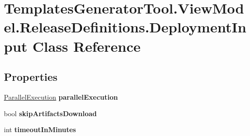 \hypertarget{class_templates_generator_tool_1_1_view_model_1_1_release_definitions_1_1_deployment_input}{}\section{Templates\+Generator\+Tool.\+View\+Model.\+Release\+Definitions.\+Deployment\+Input Class Reference}
\label{class_templates_generator_tool_1_1_view_model_1_1_release_definitions_1_1_deployment_input}
\subsection*{Properties}
\begin{DoxyCompactItemize}
\item 
\mbox{\label{class_templates_generator_tool_1_1_view_model_1_1_release_definitions_1_1_deployment_input_ab373533d0bcfe720e3e7c7c8d29e34d1}} 
\mbox{\hyperlink{class_templates_generator_tool_1_1_view_model_1_1_release_definitions_1_1_parallel_execution}{Parallel\+Execution}} {\bfseries parallel\+Execution}
\item 
\mbox{\label{class_templates_generator_tool_1_1_view_model_1_1_release_definitions_1_1_deployment_input_a86799a053e91bbe739947c5d3b6c3d4d}} 
bool {\bfseries skip\+Artifacts\+Download}
\item 
\mbox{\label{class_templates_generator_tool_1_1_view_model_1_1_release_definitions_1_1_deployment_input_a2f6c861a77fbe2b2e30d486860d9ea11}} 
int {\bfseries timeout\+In\+Minutes}
\item 
\mbox{\label{class_templates_generator_tool_1_1_view_model_1_1_release_definitions_1_1_deployment_input_a2eeccb9fae61fdbab902f9ea987408ed}} 

\end{DoxyCompactItemize}
